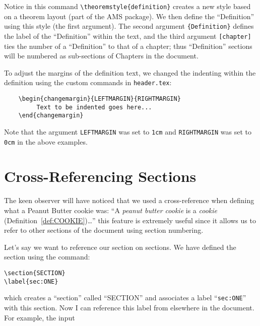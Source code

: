 Notice in this command \verb|\theoremstyle{definition}|
creates a new style based on a theorem layout (part of 
the AMS package). We then define the ``Definition'' using
this style (the first argument). The second argument 
\verb|{Definition}| defines the label of the ``Definition''
within the text, and the third argument \verb|[chapter]| ties
the number of a ``Definition'' to that of a chapter; thus
``Definition'' sections will be numbered as sub-sections of
Chapters in the document.

To adjust the margins of the definition text, we changed the
indenting within the definition using the custom commands in
\verb|header.tex|:

\begin{verbatim}
    \begin{changemargin}{LEFTMARGIN}{RIGHTMARGIN}       
         Text to be indented goes here...
    \end{changemargin}
\end{verbatim}

\noindent Note that the argument \verb|LEFTMARGIN| was set to 
\verb|1cm| and \verb|RIGHTMARGIN| was set to \verb|0cm| in the 
above examples.

\section{Cross-Referencing Sections}
\label{sec:CROSS_REF}

The keen observer will have noticed that we used a cross-reference
when defining what a Peanut Butter cookie was: ``A 
\emph{peanut butter cookie} is a \emph{cookie} 
(Definition~\ref{def:COOKIE})\dots'' this feature is extremely useful
since it allows us to refer to other sections of the document
using section numbering.

Let's say we want to reference our section on sections.
We have defined the section using the command:

\begin{verbatim}
\section{SECTION}
\label{sec:ONE}
\end{verbatim}

\noindent which creates a ``section'' called ``SECTION'' and
associates a label ``\verb|sec:ONE|'' with this section.  Now I can
reference this label from elsewhere in the document.  For example, the
input

